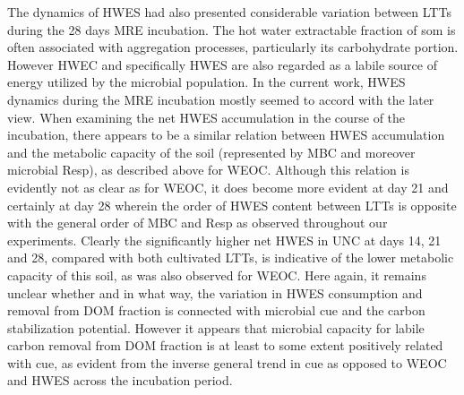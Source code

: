 The dynamics of HWES had also presented considerable variation between LTTs during the 28 days MRE incubation. The hot water extractable fraction of \gls{som} is often associated with aggregation processes, particularly its carbohydrate portion.  However HWEC and specifically HWES are also regarded as a labile source of energy utilized by the microbial population. In the current work, HWES dynamics during the MRE incubation mostly seemed to accord with the later view. When examining the net HWES accumulation in the course of the incubation, there appears to be a similar relation between HWES accumulation and the metabolic capacity of the soil (represented by MBC and moreover microbial Resp), as described above for WEOC. Although this relation is evidently not as clear as for WEOC, it does become more evident at day 21 and certainly at day 28 wherein the order of HWES content between LTTs is opposite with the general order of MBC and Resp as observed throughout our experiments. Clearly the significantly higher net HWES in UNC at days 14, 21 and 28, compared with both cultivated LTTs, is indicative of the lower metabolic capacity of this soil, as was also observed for WEOC. Here again, it remains unclear whether and in what way, the variation in HWES consumption and removal from DOM fraction is connected with microbial \gls{cue} and the carbon stabilization potential. However it appears that microbial capacity for labile carbon removal from DOM fraction is at least to some extent positively related with \gls{cue}, as evident from the inverse general trend in \gls{cue} as opposed to WEOC and HWES across the incubation period.
